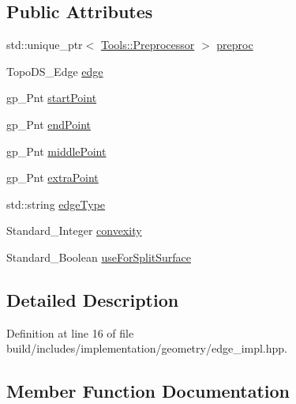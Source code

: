 \subsection*{Public Attributes}
\begin{DoxyCompactItemize}
\item 
std\+::unique\+\_\+ptr$<$ \hyperlink{classMcCAD_1_1Tools_1_1Preprocessor}{Tools\+::\+Preprocessor} $>$ \hyperlink{classMcCAD_1_1Geometry_1_1Edge_1_1Impl_a4921c9d696c5edbfe28ca3ff12d96145}{preproc}
\item 
Topo\+D\+S\+\_\+\+Edge \hyperlink{classMcCAD_1_1Geometry_1_1Edge_1_1Impl_af6c62d8c4fb496f202ea8029a1304f5c}{edge}
\item 
gp\+\_\+\+Pnt \hyperlink{classMcCAD_1_1Geometry_1_1Edge_1_1Impl_a6479fc79c6b3f2b3a9e3b779da28229d}{start\+Point}
\item 
gp\+\_\+\+Pnt \hyperlink{classMcCAD_1_1Geometry_1_1Edge_1_1Impl_afbde348ebff5e60146f75af3710ca3f7}{end\+Point}
\item 
gp\+\_\+\+Pnt \hyperlink{classMcCAD_1_1Geometry_1_1Edge_1_1Impl_a4b64052006993b74a81d32a073332f67}{middle\+Point}
\item 
gp\+\_\+\+Pnt \hyperlink{classMcCAD_1_1Geometry_1_1Edge_1_1Impl_a998153a75faa821a38038a5051290673}{extra\+Point}
\item 
std\+::string \hyperlink{classMcCAD_1_1Geometry_1_1Edge_1_1Impl_ad39b76ac0ebded9d732cbffb24a514ff}{edge\+Type}
\item 
Standard\+\_\+\+Integer \hyperlink{classMcCAD_1_1Geometry_1_1Edge_1_1Impl_a522decbb18e7fb0443e9320d52e372f3}{convexity}
\item 
Standard\+\_\+\+Boolean \hyperlink{classMcCAD_1_1Geometry_1_1Edge_1_1Impl_a4ecbfbd783f2b7a9b91d0fad17cb8ae4}{use\+For\+Split\+Surface}
\end{DoxyCompactItemize}


\subsection{Detailed Description}


Definition at line 16 of file build/includes/implementation/geometry/edge\+\_\+impl.\+hpp.



\subsection{Member Function Documentation}
\mbox{\label{classMcCAD_1_1Geometry_1_1Edge_1_1Impl_a6541fcc122721729d3f0f3001be3a8fa}} 

